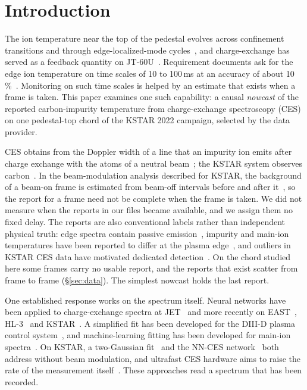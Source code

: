 \section{Introduction}
\label{sec:intro}

The ion temperature \Ti{} near the top of the pedestal evolves across confinement transitions and through edge-localized-mode cycles~\citep{Ko2015IonTemperature,Viezzer2018IonHeat}, and charge-exchange \Ti{} has served as a feedback quantity on JT-60U~\citep{Yoshida2009RealTime}. Requirement documents ask for the edge ion temperature on time scales of 10 to 100\,ms at an accuracy of about 10\,\%~\citep{Young2008PlasmaMeasurements,Donne2007ChapterDiagnostics}. Monitoring on such time scales is helped by an estimate that exists when a frame is taken. This paper examines one such capability: a causal \emph{nowcast} of the reported carbon-impurity temperature from charge-exchange spectroscopy (CES) on one pedestal-top chord of the KSTAR 2022 campaign, selected by the data provider.

CES obtains \Ti{} from the Doppler width of a line that an impurity ion emits after charge exchange with the atoms of a neutral beam~\citep{Fonck1984DeterminationPlasma}; the KSTAR system observes carbon~\citep{Ko2010ChargeExchange}. In the beam-modulation analysis described for KSTAR, the background of a beam-on frame is estimated from beam-off intervals before and after it~\citep{Lee2020TwoGaussian,Lee2026NeuralNetworkbased}, so the report for a frame need not be complete when the frame is taken. We did not measure when the reports in our files became available, and we assign them no fixed delay. The reports are also conventional labels rather than independent physical truth: edge spectra contain passive emission~\citep{Viezzer2011PassiveEdge}, impurity and main-ion temperatures have been reported to differ at the plasma edge~\citep{Haskey2018MainIon}, and outliers in KSTAR CES data have motivated dedicated detection~\citep{Kim2024KineticProfile}. On the chord studied here some frames carry no usable report, and the reports that exist scatter from frame to frame (\S\ref{sec:data}). The simplest nowcast holds the last report.

One established response works on the spectrum itself. Neural networks have been applied to charge-exchange spectra at JET~\citep{Bishop1993AutomaticAnalysis,Svensson1999AnalysisJet} and more recently on EAST~\citep{Chai2019FastEstimation}, HL-3~\citep{Tian2026RealTimeCxrs} and KSTAR~\citep{Lee2026NeuralNetworkbased}. A simplified fit has been developed for the DIII-D plasma control system~\citep{Chrystal2026RealTime}, and machine-learning fitting has been developed for main-ion spectra~\citep{Haskey2026MachineLearning}. On KSTAR, a two-Gaussian fit~\citep{Lee2020TwoGaussian} and the NN-CES network~\citep{Lee2026NeuralNetworkbased} both address \Ti{} without beam modulation, and ultrafast CES hardware aims to raise the rate of the measurement itself~\citep{Jang2021DevelopmentUltrafast}. These approaches read a spectrum that has been recorded.


